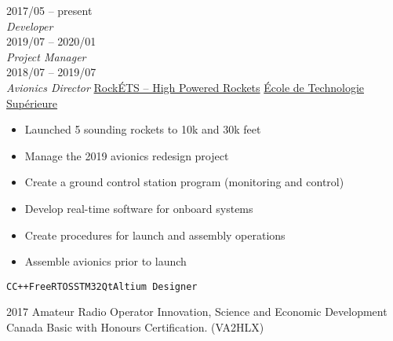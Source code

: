 \documentclass[9pt]{developercv} %
\begin{document}
\begin{minipage}[t]{0.8\textwidth}
\begin{entrylist}
	\entry
		{2017/05 -- present\\{\small\emph{Developer}}\\2019/07 -- 2020/01\\{\small\emph{Project Manager}}\\2018/07 -- 2019/07\\{\small\emph{Avionics Director}}}
		{\href{https://clubrockets.ca/en/}{RockÉTS -- High Powered Rockets}}
		{\href{https://clubrockets.ca/en/}{École de Technologie Supérieure}}
		{
			\vspace{-14pt}
			\begin{itemize}
				\renewcommand{\labelitemi}{\raisebox{.45ex}{\rule{.6ex}{.6ex}}}
				\setlength\itemsep{-1pt}
				\item Launched 5 sounding rockets to 10k and 30k feet
				\item Manage the 2019 avionics redesign project
				\item Create a ground control station program (monitoring and control)
				\item Develop real-time software for onboard systems
				\item Create procedures for launch and assembly operations
				\item Assemble avionics prior to launch
			\end{itemize}
			\vspace{-4pt}
			\texttt{C}\slashsep\texttt{C++}\slashsep\texttt{FreeRTOS}\slashsep\texttt{STM32}\slashsep\texttt{Qt}\slashsep\texttt{Altium Designer}
		}
	\end{entrylist}



	\begin{entrylist}
		\entry
			{2017}
			{Amateur Radio Operator}
			{Innovation, Science and Economic Development Canada}
			{
				Basic with Honours Certification. (VA2HLX)
			}
	\end{entrylist}
\end{minipage}
\begin{minipage}[t]{0.02\textwidth}
	\hfill
\end{minipage}
\end{document}
